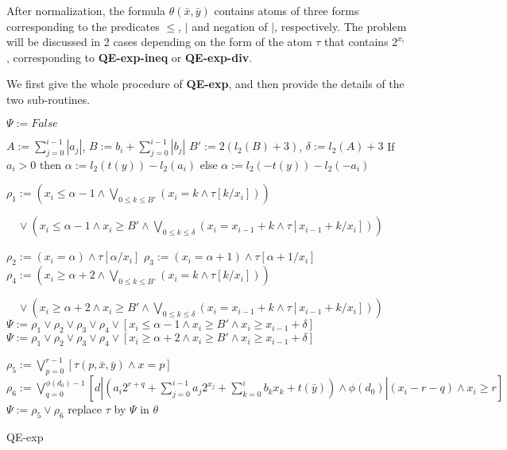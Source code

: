 \documentclass[runningheads]{llncs}
\begin{document}
After normalization, the formula $\theta(\bar{x},\bar{y})$ contains atoms of three forms corresponding to 
the predicates $\le$, $|$ and negation of $|$, respectively.
The problem will be discussed in 2 cases depending on the form of the atom $\tau$ that contains $2^{x_i}$, 
corresponding to \textbf{QE-exp-ineq} or \textbf{QE-exp-div}. 

We first give the whole procedure of \textbf{QE-exp},
and then provide the details of the two sub-routines.
\begin{algorithm}[t]
    \SetAlgoLined
    
    {
        $\Psi:= \textit{False}$\;
        { 
            $A :=  \sum_{j=0}^{i-1}|a_j|$, $B:= b_i + \sum_{j=0}^{i-1}|b_j|$\;
            $B':= 2(l_2(B)+3)$, $\delta:=  l_2(A)+3$\;
            If $a_i>0$ then $\alpha := l_2(t(y))-l_2(a_i)$
            else $\alpha := l_2(-t(y))-l_2(-a_i)$\;
            
            $\rho_1 :=  (x_i \le \alpha -1 \wedge \bigvee_{0\le k\le B'}(x_i=k \wedge \tau[k/x_i] ))$
    
            $\quad \vee ( x_i \le \alpha -1 \wedge x_i\ge B' \wedge \bigvee_{0\le k \le \delta} (x_i = x_{i-1}+k \wedge \tau[x_{i-1}+k/x_i]))$\;
                
            $\rho_2 :=  (x_i = \alpha) \wedge \tau[\alpha/x_i]$\;
            $\rho_3 :=  (x_i = \alpha+1) \wedge \tau[\alpha+1/x_i]$\;
            $\rho_4 :=  (x_i \ge \alpha+2 \wedge \bigvee_{0\le k\le B'}(x_i=k \wedge \tau[k/x_i] ))$
        
            $\quad \vee (x_i \ge \alpha +2 \wedge x_i\ge B' \wedge \bigvee_{0\le k \le \delta}(x_i = x_{i-1}+k \wedge \tau[x_{i-1}+k/x_i]))
            $\;
            {
                $\Psi := \rho_1 \vee \rho_2 \vee \rho_3 \vee \rho_4 
                \vee [x_i \le \alpha -1 \wedge x_i \ge B' \wedge x_i \ge x_{i-1}+\delta]$
            }
            {
                $\Psi := \rho_1 \vee \rho_2 \vee \rho_3 \vee \rho_4 
                \vee [x_i \ge \alpha +2 \wedge x_i \ge B' \wedge x_i \ge x_{i-1}+\delta]$    
            }
            }
        {
            $\rho_5 := \bigvee_{p=0}^{r-1} [\tau(p,\bar{x},\bar{y})\wedge x=p]$\;
            $\rho_6 := \bigvee_{q=0}^{\phi(d_0)-1} [d|(a_i 2^{r+q}+\sum_{j=0}^{i-1} a_j 2^{x_j}
            +  \sum_{k=0}^{i} b_k x_k+t(\bar{y})) \wedge \phi(d_0)|(x_i-r-q) \wedge x_i \ge r]
            $\;
            $\Psi :=  \rho_5 \vee \rho_6$
        }
        replace $\tau$ by $\Psi$ in $\theta$\;
    }
    \caption{QE-exp}
\end{algorithm}
\end{document}
